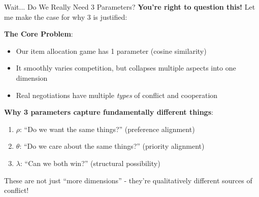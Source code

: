 \documentclass{beamer}
\begin{document}
\begin{frame}{Wait... Do We Really Need 3 Parameters?}
\textbf{You're right to question this!} Let me make the case for why 3 is justified:

\vspace{0.5cm}

\textbf{The Core Problem}: 
\begin{itemize}
    \item Our item allocation game has 1 parameter (cosine similarity)
    \item It smoothly varies competition, but collapses multiple aspects into one dimension
    \item Real negotiations have multiple \textit{types} of conflict and cooperation
\end{itemize}

\vspace{0.5cm}

\textbf{Why 3 parameters capture fundamentally different things}:
\begin{enumerate}
    \item \textbf{$\rho$}: ``Do we want the same things?'' (preference alignment)
    \item \textbf{$\theta$}: ``Do we care about the same things?'' (priority alignment)
    \item \textbf{$\lambda$}: ``Can we both win?'' (structural possibility)
\end{enumerate}

These are not just ``more dimensions'' - they're qualitatively different sources of conflict!
\end{frame}
\end{document}
